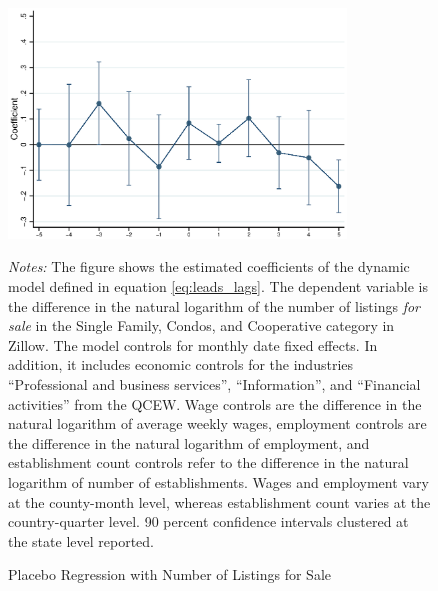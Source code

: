 \begin{figure}[htb!]\centering
	\caption{Placebo Regression with Number of Listings for Sale}
	\label{fig:placebo_nlist}
	\includegraphics[width = 0.8\textwidth]{../../analysis/first_differences_nlist/output/fd_placebo.eps}	
	\begin{minipage}{\textwidth}\footnotesize
		\textit{Notes:} The figure shows the estimated coefficients of the dynamic model defined 
		in equation \autoref{eq:leads_lags}. The dependent variable is the difference in the natural 
		logarithm of the number of listings \textit{for sale} in the Single Family, Condos, and 
		Cooperative category in Zillow. The model controls for monthly date fixed effects. In 
		addition, it includes economic controls for the industries ``Professional and business 
		services'', ``Information'', and ``Financial activities'' from the QCEW. Wage controls 
		are the difference in the natural logarithm of average weekly wages, employment controls are 
		the difference in the natural logarithm of employment, and establishment count controls refer 
		to the difference in the natural logarithm of number of establishments. Wages and employment 
		vary at the county-month level,	whereas establishment count varies at the country-quarter 
		level. 90 percent confidence intervals clustered at the state level reported. 
	\end{minipage}
\end{figure}

